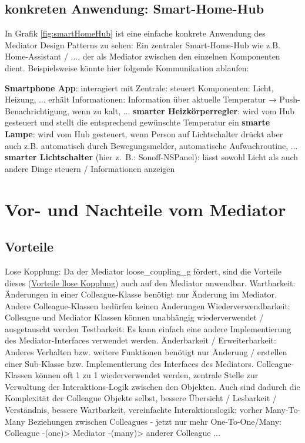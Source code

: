 \subsection{konkreten Anwendung: Smart-Home-Hub}
In Grafik \ref{fig:smartHomeHub} ist eine einfache konkrete Anwendung des Mediator Design Patterns zu sehen: Ein zentraler Smart-Home-Hub wie z.B. Home-Assistant / ..., der als Mediator zwischen den einzelnen Komponenten dient.
Beispielsweise könnte hier folgende Kommunikation ablaufen:
\begin{outline}
    \1 \textbf{Smartphone App}: interagiert mit Zentrale:
        \2 steuert Komponenten: Licht, Heizung, ...
        \2 erhält Informationen: Information über aktuelle Temperatur → Push-Benachrichtigung, wenn zu kalt, ...
    \1 \textbf{smarter Heizkörperregler}: wird vom Hub gesteuert und stellt die entsprechend gewünschte Temperatur ein
    \1 \textbf{smarte Lampe}: wird vom Hub gesteuert, wenn Person auf Lichtschalter drückt aber auch z.B. automatisch durch Bewegungsmelder, automatische Aufwachroutine, ...
    \1 \textbf{smarter Lichtschalter} (hier z. B.: Sonoff-NSPanel): lässt sowohl Licht als auch andere Dinge steuern / Informationen anzeigen
\end{outline}
% 
\section{Vor- und Nachteile vom Mediator}\label{ref:vorteileNachteile}
\filbreak
\subsection{Vorteile}
\begin{outline}
    \1 Lose Kopplung: Da der Mediator \gls{loose_coupling_g} fördert, sind die Vorteile dieses (\hyperref[ref:prosLoseKopplung]{Vorteile llose Kopplung}) auch auf den Mediator anwendbar.
        \2 Wartbarkeit: Änderungen in einer Colleague-Klasse benötigt nur Änderung im Mediator. Andere Colleague-Klassen bedürfen keinen Änderungen
        \2 Wiederverwendbarkeit: Colleague und Mediator Klassen können unabhängig wiederverwendet / ausgetauscht werden
        \2 Testbarkeit: Es kann einfach eine andere Implementierung des Mediator-Interfaces verwendet werden.
    \1 Änderbarkeit / Erweiterbarkeit: Anderes Verhalten bzw. weitere Funktionen benötigt nur Änderung / erstellen einer Sub-Klasse bzw. Implementierung des Interfaces des Mediators. Colleague-Klassen können oft 1 zu 1 wiederverwendet werden,
    \1 zentrale Stelle zur Verwaltung der Interaktions-Logik zwischen den Objekten. Auch sind dadurch die Komplexität der Colleague Objekte selbst,
        \2 bessere Übersicht / Lesbarkeit / Verständnis,
        \2 bessere Wartbarkeit,
        \2 vereinfachte Interaktionslogik: vorher Many-To-Many Beziehungen zwischen Colleagues - jetzt nur mehr One-To-One/Many: Colleague -(one)> Mediator -(many)> anderer Colleague
    \1 ...
\end{outline}

